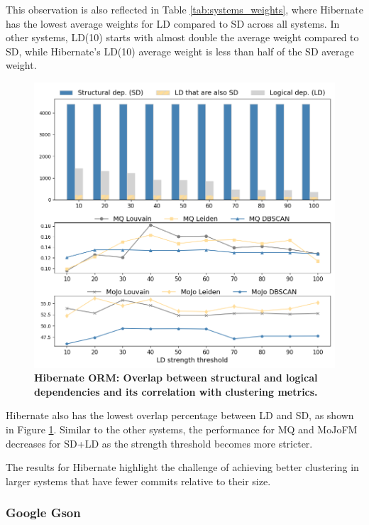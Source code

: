\documentclass{ieeeaccess}
\begin{document}
This observation is also reflected in Table \ref{tab:systems_weights}, where Hibernate has the lowest average weights for LD compared to SD across all systems. In other systems, LD(10) starts with almost double the average weight compared to SD, while Hibernate's LD(10) average weight is less than half of the SD average weight.

\begin{figure}[t!]
  \centering
  \includegraphics[width=\columnwidth]{hibernate_correlation.png}
  \caption{\textbf{Hibernate ORM: Overlap between structural and logical dependencies and its correlation with clustering metrics.}}
  \label{fig:hibernate_correlation}
\end{figure}

Hibernate also has the lowest overlap percentage between LD and SD, as shown in Figure \ref{fig:hibernate_correlation}. Similar to the other systems, the performance for MQ and MoJoFM decreases for SD+LD as the strength threshold becomes more stricter.

The results for Hibernate highlight the challenge of achieving better clustering in larger systems that have fewer commits relative to their size.



\subsubsection{Google Gson}
\end{document}
